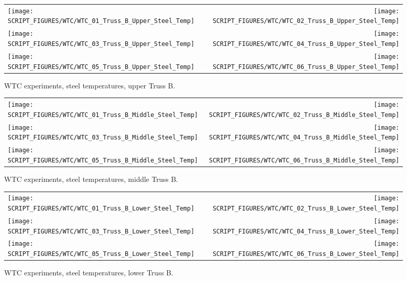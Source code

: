 \begin{figure}[p]
\begin{tabular*}{\textwidth}{l@{\extracolsep{\fill}}r}
\texttt{[image: SCRIPT\_FIGURES/WTC/WTC\_01\_Truss\_B\_Upper\_Steel\_Temp]} &
\texttt{[image: SCRIPT\_FIGURES/WTC/WTC\_02\_Truss\_B\_Upper\_Steel\_Temp]} \\
\texttt{[image: SCRIPT\_FIGURES/WTC/WTC\_03\_Truss\_B\_Upper\_Steel\_Temp]} &
\texttt{[image: SCRIPT\_FIGURES/WTC/WTC\_04\_Truss\_B\_Upper\_Steel\_Temp]} \\
\texttt{[image: SCRIPT\_FIGURES/WTC/WTC\_05\_Truss\_B\_Upper\_Steel\_Temp]} &
\texttt{[image: SCRIPT\_FIGURES/WTC/WTC\_06\_Truss\_B\_Upper\_Steel\_Temp]}
\end{tabular*}
\caption[WTC experiments, steel temperatures, upper Truss B]{WTC experiments, steel temperatures, upper Truss B.}
\label{NIST_WTC_Truss_B_Upper_Steel_Temp}
\end{figure}

\begin{figure}[p]
\begin{tabular*}{\textwidth}{l@{\extracolsep{\fill}}r}
\texttt{[image: SCRIPT\_FIGURES/WTC/WTC\_01\_Truss\_B\_Middle\_Steel\_Temp]} &
\texttt{[image: SCRIPT\_FIGURES/WTC/WTC\_02\_Truss\_B\_Middle\_Steel\_Temp]} \\
\texttt{[image: SCRIPT\_FIGURES/WTC/WTC\_03\_Truss\_B\_Middle\_Steel\_Temp]} &
\texttt{[image: SCRIPT\_FIGURES/WTC/WTC\_04\_Truss\_B\_Middle\_Steel\_Temp]} \\
\texttt{[image: SCRIPT\_FIGURES/WTC/WTC\_05\_Truss\_B\_Middle\_Steel\_Temp]} &
\texttt{[image: SCRIPT\_FIGURES/WTC/WTC\_06\_Truss\_B\_Middle\_Steel\_Temp]}
\end{tabular*}
\caption[WTC experiments, steel temperatures, middle Truss B]{WTC experiments, steel temperatures, middle Truss B.}
\label{NIST_WTC_Truss_B_Middle_Steel_Temp}
\end{figure}

\begin{figure}[p]
\begin{tabular*}{\textwidth}{l@{\extracolsep{\fill}}r}
\texttt{[image: SCRIPT\_FIGURES/WTC/WTC\_01\_Truss\_B\_Lower\_Steel\_Temp]} &
\texttt{[image: SCRIPT\_FIGURES/WTC/WTC\_02\_Truss\_B\_Lower\_Steel\_Temp]} \\
\texttt{[image: SCRIPT\_FIGURES/WTC/WTC\_03\_Truss\_B\_Lower\_Steel\_Temp]} &
\texttt{[image: SCRIPT\_FIGURES/WTC/WTC\_04\_Truss\_B\_Lower\_Steel\_Temp]} \\
\texttt{[image: SCRIPT\_FIGURES/WTC/WTC\_05\_Truss\_B\_Lower\_Steel\_Temp]} &
\texttt{[image: SCRIPT\_FIGURES/WTC/WTC\_06\_Truss\_B\_Lower\_Steel\_Temp]}
\end{tabular*}
\caption[WTC experiments, steel temperatures, lower Truss B]{WTC experiments, steel temperatures, lower Truss B.}
\label{NIST_WTC_Truss_B_Lower_Steel_Temp}
\end{figure}


